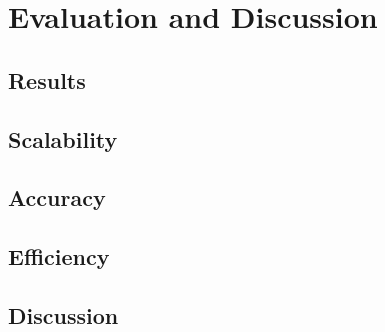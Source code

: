 \chapter{Evaluation and Discussion}\label{ch:evaluation}
\section{Results}
\section{Scalability}
\section{Accuracy}
\section{Efficiency}
\section{Discussion}



